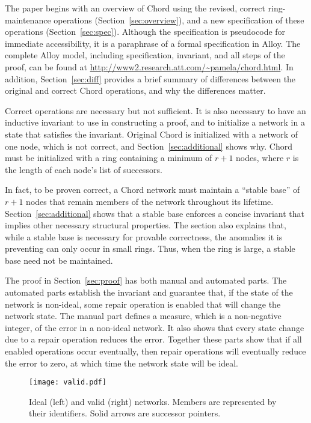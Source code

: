 \documentclass[conference]{IEEEtran}
\begin{document}
The paper begins with an overview of Chord using the revised, correct
ring-maintenance operations
(Section~\ref{sec:overview}), and a new specification of these
operations (Section~\ref{sec:spec}).
Although the specification
is pseudocode for immediate accessibility, it is a paraphrase
of a formal specification in Alloy.
The complete Alloy model, including specification, invariant, and 
all steps of the proof,
can be found at
\url{http://www2.research.att.com/~pamela/chord.html}.
In addition, Section~\ref{sec:diff} provides a brief summary of 
differences between the original and correct Chord operations,
and why the differences matter.

Correct operations are necessary but not sufficient.
It is also necessary to have an inductive invariant
to use in constructing a proof, and to
initialize a network in a state that satisfies the invariant.
Original Chord is initialized with a network of one node,
which is
not correct, and
Section~\ref{sec:additional} shows why.
Chord must be initialized 
with a ring containing a minimum of $r + 1$ nodes, where
$r$ is the length of each node's list of successors.

In fact, to be proven correct, a Chord network must maintain a
``stable base'' of $r + 1$ nodes that
remain members of the network throughout its lifetime.
Section~\ref{sec:additional} shows that
a stable base enforces a concise invariant that implies
other necessary structural properties.
The section also explains that, while a stable base is necessary for
provable correctness, the anomalies it is preventing can only occur
in small rings.
Thus, when the ring is large, a stable base need not be maintained.

The proof in
Section~\ref{sec:proof}
has both manual and automated parts.
The automated parts establish the invariant and guarantee that, if
the state of the network is non-ideal, some repair
operation is enabled that
will change the network state.
The manual part defines a measure, which is a non-negative integer,
of the error in a non-ideal network.
It also shows that every state change due to a repair operation reduces
the error.
Together these parts show that if all enabled operations
occur eventually, then repair operations will eventually reduce
the error to zero, at which time the network state will be ideal.

\begin{figure}
\centering
\texttt{[image: valid.pdf]}
\caption{Ideal (left) and valid (right) networks.
Members are represented by their identifiers.
Solid arrows are successor pointers.}
\label{fig:valid}
\end{figure}
\end{document}
